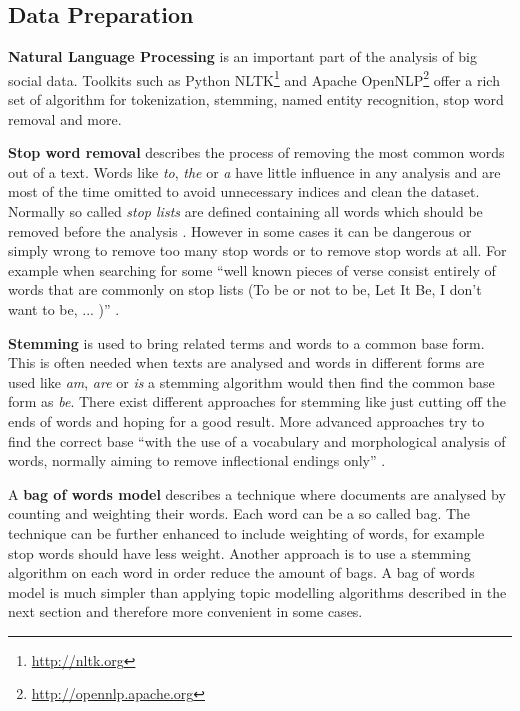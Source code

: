 \subsection{Data Preparation}
\label{subsec:data-preparation}
\textbf{Natural Language Processing} is an important part of the analysis of big social data. Toolkits such as Python NLTK\footnote{\url{http://nltk.org} \accessednote} and Apache OpenNLP\footnote{\url{http://opennlp.apache.org} \accessednote} offer a rich set of algorithm for tokenization, stemming, named entity recognition, stop word removal and more.

\textbf{Stop word removal} describes the process of removing the most common words out of a text. Words like \textit{to}, \textit{the} or \textit{a} have little influence in any analysis and are most of the time omitted to avoid unnecessary indices and clean the dataset. Normally so called \textit{stop lists} are defined containing all words which should be removed before the analysis \cite[27]{manning2008introduction}. However in some cases it can be dangerous or simply wrong to remove too many stop words or to remove stop words at all. For example when searching for some \enquote{well known pieces of verse consist entirely of words that are commonly on stop lists (To be or not to be, Let It Be, I don’t want to be, ... )} \cite[27]{manning2008introduction}.

\textbf{Stemming} is used to bring related terms and words to a common base form. This is often needed when texts are analysed and words in different forms are used like \textit{am}, \textit{are} or \textit{is} a stemming algorithm would then find the common base form as \textit{be}. There exist different approaches for stemming like just cutting off the ends of words and hoping for a good result. More advanced approaches try to find the correct base \enquote{with the use of a vocabulary and morphological analysis of words, normally aiming to remove inflectional endings only} \cite[32]{manning2008introduction}.

A \textbf{bag of words model} describes a technique where documents are analysed by counting and weighting their words. Each word can be a so called bag. The technique can be further enhanced to include weighting of words, for example stop words should have less weight. Another approach is to use a stemming algorithm on each word in order reduce the amount of bags. A bag of words model is much simpler than applying topic modelling algorithms described in the next section and therefore more convenient in some cases. \cite[117]{manning2008introduction} 

